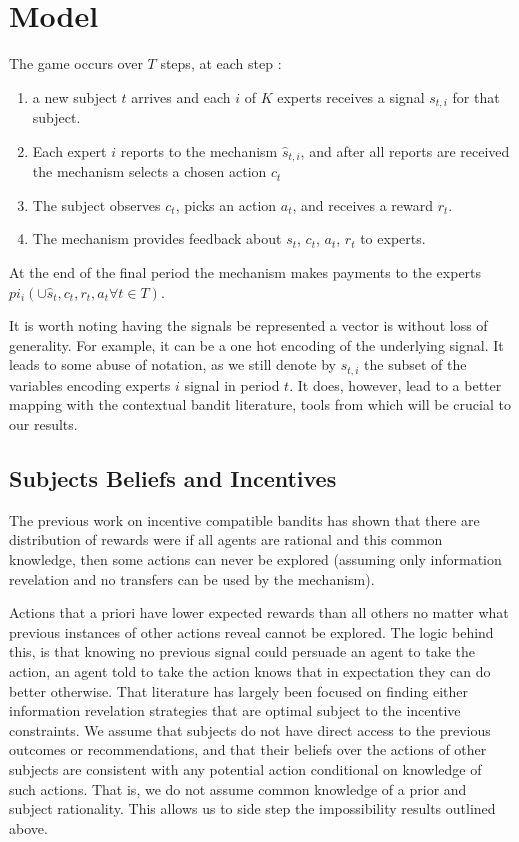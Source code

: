\section{Model}

The game occurs over $T$ steps, at each step : 

\begin{enumerate}
\item a new subject $t$ arrives and each $i$ of $K$ experts receives a signal $s_{t,i}$ for that subject.
\item Each expert $i$ reports to the mechanism $\hat{s}_{t,i}$, and after all reports are received the mechanism selects a chosen action $c_t$
\item The subject observes $c_t$, picks an action $a_t$, and receives a reward $r_t$.
\item The mechanism provides feedback about $s_t$, $c_t$, $a_t$, $r_t$ to experts.
\end{enumerate}
At the end of the final period the mechanism makes payments to the experts $pi_i( \cup \hat{s}_t,c_t,r_t,a_t \forall t \in T)$.


It is worth noting having the signals be represented a vector is without loss of generality.
For example, it can be a one hot encoding of the underlying signal.
It leads to some abuse of notation, as we still denote by $s_{t,i}$ the subset of the variables encoding experts $i$ signal in period $t$. It does, however, lead to a better mapping with the contextual bandit literature, tools from which will be crucial to our results. 

\subsection{Subjects Beliefs and Incentives}

The previous work on incentive compatible bandits \cite{kremer2014implementing,mansour2015bayesian} has shown that there are distribution of rewards were if all agents are rational and this common knowledge, then some actions can never be explored (assuming only information revelation and no transfers can be used by the mechanism). 

Actions that a priori have lower expected rewards than all others no matter what previous instances of other actions reveal cannot be explored.
The logic behind this, is that knowing no previous signal could persuade an agent to take the action, an agent told to take the action knows that in expectation they can do better otherwise.
That literature has largely been focused on finding either information revelation strategies that are optimal subject to the incentive constraints. 
We assume that subjects do not have direct access to the previous outcomes or recommendations, and that their beliefs over the actions of other subjects are consistent with any potential action conditional on knowledge of such actions.
That is, we do not assume common knowledge of a prior and subject rationality.
This allows us to side step the impossibility results outlined above. 


